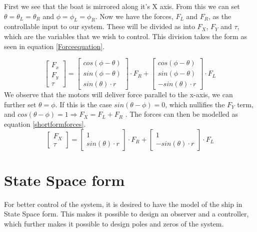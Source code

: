 \documentclass{article}
\begin{document}
First we see that the boat is mirrored along it's X axis. From this we can set $\theta = \theta_L = \theta_R$ and $\phi = \phi_L = \phi_R$.  Now we have the forces, $F_L$ and $F_R$, as the controllable input to our system. These will be divided as into $F_X$, $F_Y$ and $\tau$, which are the variables that we wish to control. This division takes the form as seen in equation \eqref{Forceequation}.

\begin{equation}
\left[
\begin{matrix}
F_x\\
F_y\\
\tau
\end{matrix}
\right]
 =
 \left[
\begin{matrix}
cos(\phi - \theta)\\
sin(\phi - \theta)\\
sin(\theta) \cdot r
\end{matrix}
\right]
\cdot F_R
+
 \left[
\begin{matrix}
cos(\phi - \theta)\\
sin(\phi - \theta)\\
-sin(\theta) \cdot r
\end{matrix}
\right]
\cdot
F_L
\label{Forceequation}
\end{equation}
We observe that the motors will deliver force parallel to the x-axis, we can further set $\theta = \phi$. If this is the case $sin(\theta - \phi)=0$, which nullifies the $F_Y$ term, and $cos(\theta-\phi) = 1 \Longrightarrow F_X = F_L+F_R$ . The forces can then be modelled as equation \eqref{shortformforces}.
\begin{equation}
\left[\begin{matrix}
F_X\\
\tau
\end{matrix}
\right]
= 
\left[
\begin{matrix}
1\\
sin(\theta)\cdot r
\end{matrix}
\right]
\cdot F_R
+ 
\left[
\begin{matrix}
1\\
-sin(\theta)\cdot r
\end{matrix}
\right]
\cdot F_L
\label{shortformforces}
\end{equation}

\section{State Space form}
For better control of the system, it is desired to have the model of the ship in State Space form. This makes it possible to design an observer and a controller, which further makes it possible to design poles and zeros of the system.
\end{document}
